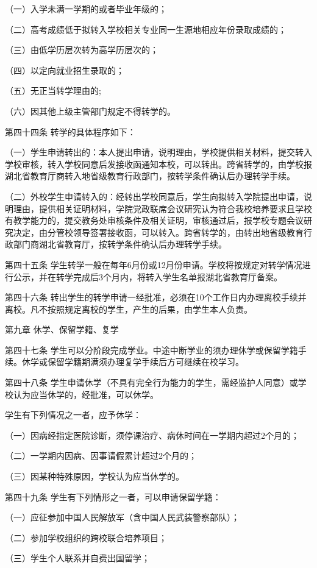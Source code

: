 \documentclass[UTF8,12pt,a4paper]{report}
\begin{document}
（一）入学未满一学期的或者毕业年级的；

（二）高考成绩低于拟转入学校相关专业同一生源地相应年份录取成绩的；

（三）由低学历层次转为高学历层次的；

（四）以定向就业招生录取的；

（五）无正当转学理由的;

（六）因其他上级主管部门规定不得转学的。

第四十四条  转学的具体程序如下：

（一）学生申请转出的：本人提出申请，说明理由，学校提供相关材料，提交转入学校审核，转入学校同意后发接收函通知本校，可以转出。跨省转学的，由学校报湖北省教育厅商转入地省级教育行政部门，按转学条件确认后办理转学手续。

（二）外校学生申请转入的：经转出学校同意后，学生向拟转入学院提出申请，说明理由，提供相关证明材料，学院党政联席会议研究认为符合我校培养要求且学校有教学能力的，提交教务处审核条件及相关证明，审核通过后，报学校专题会议研究决定，由分管校领导签署接收函，可以转入。跨省转学的，由转出地省级教育行政部门商湖北省教育厅，按转学条件确认后办理转学手续。

第四十五条  学生转学一般在每年6月份或12月份申请。学校将按规定对转学情况进行公示，并在转学完成后3个月内，将转入学生名单报湖北省教育厅备案。

第四十六条  转出学生的转学申请一经批准，必须在10个工作日内办理离校手续并离校。凡不按照规定离校的学生，产生的后果，由学生本人负责。

第九章  休学、保留学籍、复学

第四十七条  学生可以分阶段完成学业。中途中断学业的须办理休学或保留学籍手续。休学或保留学籍期满须办理复学手续后方可继续在校学习。

第四十八条  学生申请休学（不具有完全行为能力的学生，需经监护人同意）或学校认为应当休学的，经批准，可以休学。

学生有下列情况之一者，应予休学：

（一）因病经指定医院诊断，须停课治疗、病休时间在一学期内超过2个月的；

（二）一学期内因病、因事请假累计超过2个月的；

（三）因某种特殊原因，学校认为应当休学的。

第四十九条  学生有下列情形之一者，可以申请保留学籍：

（一）应征参加中国人民解放军（含中国人民武装警察部队）；

（二）参加学校组织的跨校联合培养项目；

（三）学生个人联系并自费出国留学；
\end{document}
